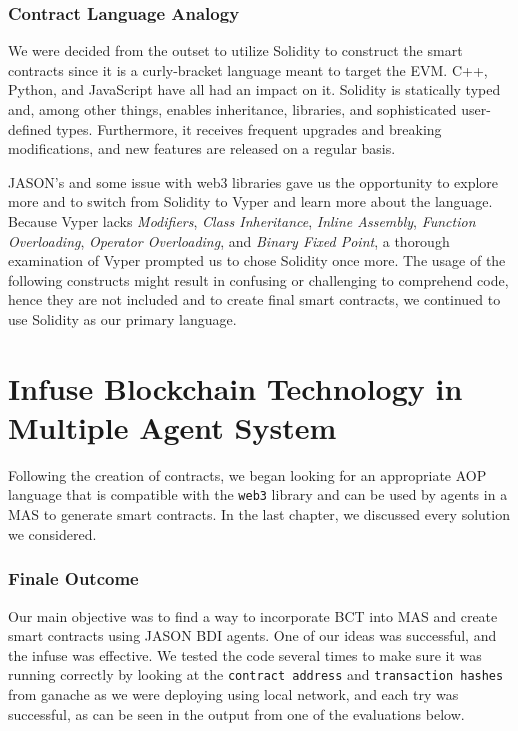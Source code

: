 \subsubsection{Contract Language Analogy}

We were decided from the outset to utilize Solidity to construct the smart contracts since it is a curly-bracket language meant to target the \ac{EVM}. C++, Python, and JavaScript have all had an impact on it. Solidity is statically typed and, among other things, enables inheritance, libraries, and sophisticated user-defined types. Furthermore, it receives frequent upgrades and breaking modifications, and new features are released on a regular basis. 

\vspace{.5cm}

JASON's and some issue with web3 libraries gave us the opportunity to explore more and to switch from Solidity to Vyper and learn more about the language. Because Vyper lacks \textit{Modifiers}, \textit{Class Inheritance}, \textit{Inline Assembly}, \textit{Function Overloading}, \textit{Operator Overloading}, and \textit{Binary Fixed Point}, a thorough examination of Vyper prompted us to chose Solidity once more. The usage of the following constructs might result in confusing or challenging to comprehend code, hence they are not included and to create final smart contracts, we continued to use Solidity as our primary language.


\section{Infuse Blockchain Technology in Multiple Agent System}

Following the creation of contracts, we began looking for an appropriate \ac{AOP} language that is compatible with the \texttt{web3} library and can be used by agents in a \ac{MAS} to generate smart contracts. In the last chapter, we discussed every solution we considered. 

\subsubsection{Finale Outcome}

Our main objective was to find a way to incorporate \ac{BCT} into \ac{MAS} and create smart contracts using JASON \ac{BDI} agents. One of our ideas was successful, and the infuse was effective. We tested the code several times to make sure it was running correctly by looking at the \texttt{contract address} and \texttt{transaction hashes} from ganache as we were deploying using local network, and each try was successful, as can be seen in the output from one of the evaluations below.

